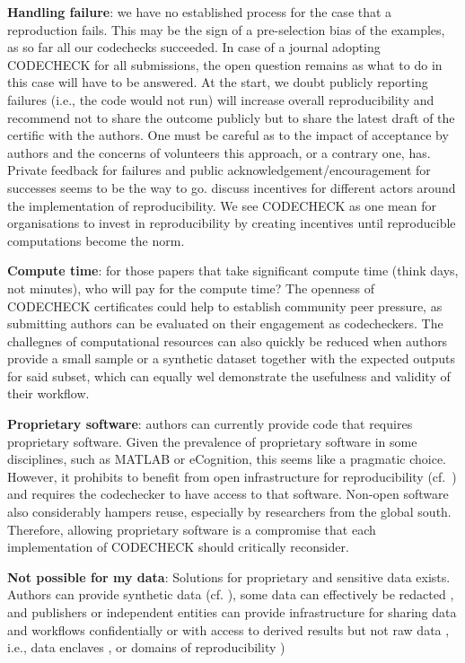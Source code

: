 \documentclass[12pt]{article}
\begin{document}
\textbf{Handling failure}: we have no established process for the case
that a reproduction fails. This may be the sign of a pre-selection bias
of the examples, as so far all our codechecks succeeded.
In case of a journal adopting CODECHECK for all submissions, the open 
question remains as what to do in this case will have to be answered.
At the start, we doubt publicly reporting failures (i.e., the code 
would not run) will increase overall reproducibility and recommend not
to share the outcome publicly but to share the latest draft of the 
certific with the authors.
One must be careful as to the impact of acceptance by authors and the
concerns of volunteers this approach, or a contrary one, has.
Private feedback for failures and public acknowledgement/encouragement
for successes seems to be the way to go.
\cite{Rosenthal2016b} discuss incentives for different actors around the
implementation of reproducibility. We see CODECHECK as one mean for
organisations to invest in reproducibility by creating incentives
until reproducible computations become the norm.

\textbf{Compute time}: for those papers that take significant compute
time (think days, not minutes), who will pay for the compute time?
The openness of CODECHECK certificates could help to establish community
peer pressure, as submitting authors can be evaluated on their engagement
as codecheckers.
The challegnes of computational resources can also quickly be reduced when
authors provide a small sample or a synthetic dataset together with the
expected outputs for said subset, which can equally wel demonstrate the 
usefulness and validity of their workflow.

\textbf{Proprietary software}: authors can currently provide code that requires
proprietary software. Given the prevalence of proprietary software in
some disciplines, such as MATLAB or eCognition,
this seems like a pragmatic choice.
However, it prohibits to benefit from open infrastructure for reproducibility
(cf.~\cite{konkol_publishing_2020,perkel_make_2019})
and requires the codechecker to have access to that software.
Non-open software also considerably hampers reuse, especially by researchers
from the global south. Therefore, allowing proprietary software is a compromise
that each implementation of CODECHECK should critically reconsider.

\textbf{Not possible for my data}: 
Solutions for proprietary and sensitive data exists.
Authors can provide synthetic data (cf. \cite{shannon_opening_2018}), some
data can effectively be redacted \cite{oloughlin_data_2015}, and publishers or
independent entities can provide infrastructure for sharing data and workflows
confidentially \cite{perignon_certify_2019} or with access to derived results
but not raw data \cite{shannon_opening_2018},
i.e., data enclaves \cite{foster_research_2018},
or domains of reproducibility \cite{harris_more_2017})
\end{document}
